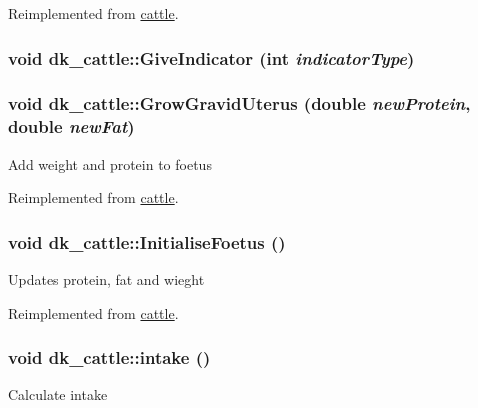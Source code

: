 Reimplemented from \hyperlink{classcattle_a32f9c2c17b16e891f8e208754865d734}{cattle}.\hypertarget{classdk__cattle_ad8e041161b0fc41e5fecd82efb58c4ec}{
\subsubsection[{GiveIndicator}]{\setlength{\rightskip}{0pt plus 5cm}void dk\_\-cattle::GiveIndicator (int {\em indicatorType})}}
\label{classdk__cattle_ad8e041161b0fc41e5fecd82efb58c4ec}
\hypertarget{classdk__cattle_aa008034a90d25b2682169fc87651a45b}{
\subsubsection[{GrowGravidUterus}]{\setlength{\rightskip}{0pt plus 5cm}void dk\_\-cattle::GrowGravidUterus (double {\em newProtein}, \/  double {\em newFat})}}
\label{classdk__cattle_aa008034a90d25b2682169fc87651a45b}
Add weight and protein to foetus 

Reimplemented from \hyperlink{classcattle_a4998e90c175bd1e1aa4b57fcfcc5b281}{cattle}.\hypertarget{classdk__cattle_aa0979fed4c6facc5d1dbd86c38faaa13}{
\subsubsection[{InitialiseFoetus}]{\setlength{\rightskip}{0pt plus 5cm}void dk\_\-cattle::InitialiseFoetus ()}}
\label{classdk__cattle_aa0979fed4c6facc5d1dbd86c38faaa13}
Updates protein, fat and wieght 

Reimplemented from \hyperlink{classcattle_ab41b2206b12b2f5bd16dd817960315bd}{cattle}.\hypertarget{classdk__cattle_ac26882672df3b641aa96104dcb4eccef}{
\subsubsection[{intake}]{\setlength{\rightskip}{0pt plus 5cm}void dk\_\-cattle::intake ()}}
\label{classdk__cattle_ac26882672df3b641aa96104dcb4eccef}
Calculate intake 

